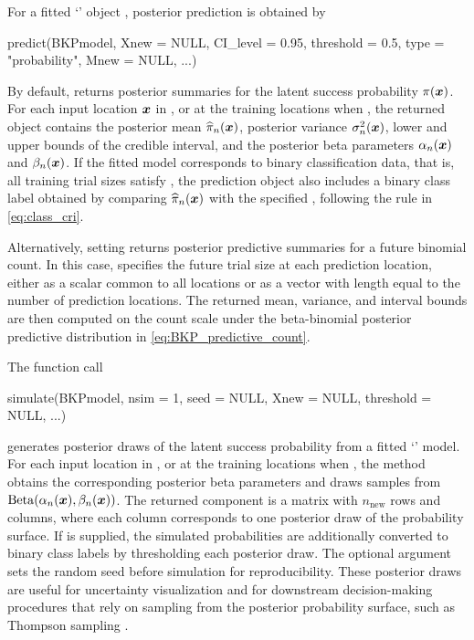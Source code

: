 \documentclass[article, shortnames]{jss}
\newcommand{\class}[1]{`\code{#1}'}
\renewcommand{\vec}[1]{\mbox{\boldmath ${#1}$}}
\begin{document}
For a fitted \class{BKP} object , posterior prediction is obtained by
\begin{Code}
predict(BKPmodel, Xnew = NULL, CI_level = 0.95, threshold = 0.5,
	type = "probability", Mnew = NULL, ...)
\end{Code}
By default,  returns posterior summaries for the latent success probability $\pi(\vec{x})$. For each input location $\vec{x}$ in , or at the training locations when , the returned object contains the posterior mean $\widehat{\pi}_n(\vec{x})$, posterior variance $\sigma_n^2(\vec{x})$, lower and upper bounds of the  credible interval, and the posterior beta parameters $\alpha_n(\vec{x})$ and $\beta_n(\vec{x})$. If the fitted model corresponds to binary classification data, that is, all training trial sizes satisfy , the prediction object also includes a binary class label obtained by comparing $\widehat{\pi}_n(\vec{x})$ with the specified , following the rule in \eqref{eq:class_cri}.

Alternatively, setting  returns posterior predictive summaries for a future binomial count. In this case,  specifies the future trial size at each prediction location, either as a scalar common to all locations or as a vector with length equal to the number of prediction locations. The returned mean, variance, and interval bounds are then computed on the count scale under the beta-binomial posterior predictive distribution in \eqref{eq:BKP_predictive_count}.

The function call
\begin{Code}
simulate(BKPmodel, nsim = 1, seed = NULL, Xnew = NULL, threshold = NULL, ...)
\end{Code}
generates posterior draws of the latent success probability from a fitted \class{BKP} model. For each input location in , or at the training locations when , the method obtains the corresponding posterior beta parameters and draws  samples from $\mathrm{Beta}(\alpha_n(\vec{x}), \beta_n(\vec{x}))$. The returned  component is a matrix with $n_{\mathrm{new}}$ rows and  columns, where each column corresponds to one posterior draw of the probability surface. If  is supplied, the simulated probabilities are additionally converted to binary class labels by thresholding each posterior draw. The optional  argument sets the random seed before simulation for reproducibility. These posterior draws are useful for uncertainty visualization and for downstream decision-making procedures that rely on sampling from the posterior probability surface, such as Thompson sampling \citep{Garnett2023BO}.
\end{document}
